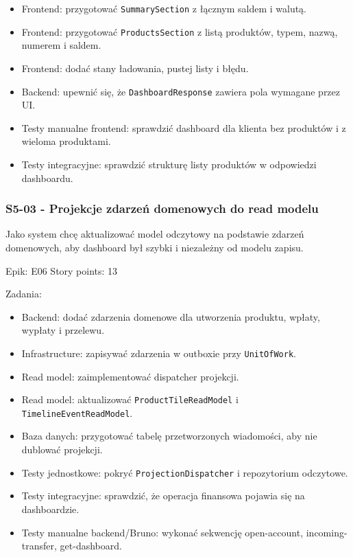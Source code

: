 \documentclass[12pt,a4paper]{article}
\begin{document}
\begin{itemize}
\item Frontend: przygotować \texttt{SummarySection} z łącznym saldem i walutą.
\item Frontend: przygotować \texttt{ProductsSection} z listą produktów, typem, nazwą, numerem i saldem.
\item Frontend: dodać stany ładowania, pustej listy i błędu.
\item Backend: upewnić się, że \texttt{DashboardResponse} zawiera pola wymagane przez UI.
\item Testy manualne frontend: sprawdzić dashboard dla klienta bez produktów i z wieloma produktami.
\item Testy integracyjne: sprawdzić strukturę listy produktów w odpowiedzi dashboardu.
\end{itemize}

\subsubsection*{S5-03 - Projekcje zdarzeń domenowych do read modelu}

Jako system chcę aktualizować model odczytowy na podstawie zdarzeń domenowych, aby dashboard był szybki i niezależny od modelu zapisu.

Epik: E06
Story points: 13

Zadania:

\begin{itemize}
\item Backend: dodać zdarzenia domenowe dla utworzenia produktu, wpłaty, wypłaty i przelewu.
\item Infrastructure: zapisywać zdarzenia w outboxie przy \texttt{UnitOfWork}.
\item Read model: zaimplementować dispatcher projekcji.
\item Read model: aktualizować \texttt{ProductTileReadModel} i \texttt{TimelineEventReadModel}.
\item Baza danych: przygotować tabelę przetworzonych wiadomości, aby nie dublować projekcji.
\item Testy jednostkowe: pokryć \texttt{ProjectionDispatcher} i repozytorium odczytowe.
\item Testy integracyjne: sprawdzić, że operacja finansowa pojawia się na dashboardzie.
\item Testy manualne backend/Bruno: wykonać sekwencję open-account, incoming-transfer, get-dashboard.
\end{itemize}
\end{document}
